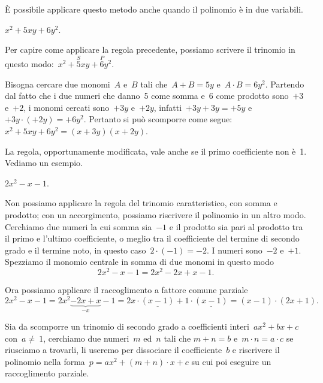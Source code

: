 È possibile applicare questo metodo anche quando il
polinomio è in due variabili.

 \begin{esempio}
 $x^{2}+5xy+6y^{2}$.

 Per capire come applicare la regola precedente, possiamo scrivere il
trinomio in questo modo:~$x^{2}+\overset{S}{5}xy+\overset{P}{6}y{^{2}}$.

Bisogna cercare due monomi~$A$ e~$B$ tali che~$A+B=5y$
e~$A\cdot B=6y^{2}$. Partendo dal fatto che i due numeri che danno~5
come somma e~6 come prodotto sono~$+3$ e~$+2$, i monomi cercati 
sono~$+3y$ e~$+2y$, infatti~$+3y+3y=+5y$ e~$+3y\cdot (+2y)=+6y^{2}$. 
Pertanto si può scomporre come segue:~$x^{2}+5xy+6y^{2}=(x+3y)(x+2y)$.
 \end{esempio}

La regola, opportunamente modificata, vale anche se il primo
coefficiente non è~1. Vediamo un esempio.

 \begin{esempio}
 $2x^{2}-x-1$.

Non possiamo applicare la regola del trinomio caratteristico, con somma
e prodotto; con un accorgimento, possiamo riscrivere il polinomio in un
altro modo. Cerchiamo due numeri la cui somma sia~$-1$ e il prodotto sia
pari al prodotto tra il primo e l'ultimo coefficiente,
o meglio tra il coefficiente del termine di secondo grado e il termine
noto, in questo caso~$2\cdot (-1)=-2$. I numeri sono~$-2$ e~$+1$.
Spezziamo il monomio centrale in somma di due monomi in questo modo
\[2x^{2}-x-1=2x^{2}-2x+x-1.\]

Ora possiamo applicare il raccoglimento a fattore comune parziale
\[2x^{2}-x-1=2x^{2}\underbrace{-2x+x}_{-x}-1=2x\cdot
\underline{{(x-1)}}+1\cdot
\underline{{(x-1)}}=\left(x-1\right)\cdot \left(2x+1\right).\]
 \end{esempio}

\begin{procedura}
Sia da scomporre un trinomio di secondo grado a coefficienti 
interi~$ax^{2}+bx+c$
con~$a\neq~1$, cerchiamo due numeri~$m$ ed~$n$ tali che  $m+n=b$ e~$m\cdot 
n=a\cdot c$
se riusciamo a trovarli, li useremo per dissociare
il coefficiente~$b$ e riscrivere il polinomio nella 
forma~$p=ax^{2}+\left(m+n\right)\cdot x+c$
su cui poi eseguire un raccoglimento parziale.
\end{procedura}

